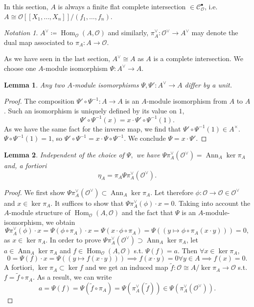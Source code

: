 \documentclass{article}
\theoremstyle{plain}%
\newtheorem{lemma}{Lemma}[section]
\theoremstyle{definition}
\theoremstyle{remark}
\newtheorem*{notation}{Notation}
\newcommand{\cob}{\mathcal{C}_\mathcal{O}^\bullet}
\newcommand{\ann}{\operatorname{Ann}}
\renewcommand{\hom}{\operatorname{Hom}}
\begin{document}
In this section, \(A\) is always a finite flat complete intersection \(\in \cob\), 
i.e. \(A \cong \mathcal{O}[[X_1, \dots, X_n]]/(f_1, \dots, f_n)\).
\begin{notation}
    \(A^\vee \coloneqq \hom_\mathcal{O}(A, \mathcal{O})\) and similarly, \(\pi_A^\vee \colon \mathcal{O}^\vee \to A^\vee\) 
    may denote the dual map associated to \(\pi_A\colon A \to \mathcal{O}\).
\end{notation}
As we have seen in the last section, \(A^\vee \cong A\) as \(A\) is a complete intersection.
We choose one \(A\)-module isomorphism \(\Psi\colon A^\vee \to A\).
\begin{lemma}
    Any two \(A\)-module isomorphisms \(\Psi, \Psi' \colon A^\vee \to A\) differ by a unit.
\end{lemma}
\begin{proof}
    The composition \(\Psi' \circ \Psi^{-1} \colon A \to A\) is an \(A\)-module isomorphism from \(A\) to \(A\).
    Such an isomorphism is uniquely defined by its value on \(1\),
    \[
        \Psi' \circ \Psi^{-1}(x) = x \cdot \Psi' \circ \Psi^{-1}(1).
    \]
    As we have the same fact for the inverse map, we find that \(\Psi' \circ \Psi^{-1}(1) \in A^\times\).
    \(\Psi \circ \Psi^{-1}(1) = 1\), so \(\Psi' \circ \Psi^{-1} = x \cdot \Psi \circ \Psi^{-1}\).
    We conclude \(\Psi = x \cdot \Psi'\).
\end{proof}

\begin{lemma}
    Independent of the choice of \(\Psi,\) we have 
    \(\Psi \pi_A^\vee(\mathcal{O}^\vee) = \ann_A \ker \pi_A\) and, a fortiori
    \[
        \eta_A = \pi_A \Psi \pi_A^\vee(\mathcal{O}^\vee).  
    \]
\end{lemma}
\begin{proof}
    We first show \(\Psi \pi_A^\vee(\mathcal{O}^\vee) \subset \ann_A \ker \pi_A\).
    Let therefore \(\phi\colon \mathcal{O} \to \mathcal{O} \in \mathcal{O}^\vee\) and \(x \in \ker \pi_A\).
    It suffices to show that \(\Psi \pi_A^\vee(\phi) \cdot x = 0\).
    Taking into account the \(A\)-module structure of \(\hom_\mathcal{O}(A, \mathcal{O})\) 
    and the fact that \(\Psi\) is an \(A\)-module-isomorphism, we obtain
    \[
        \Psi \pi_A^\vee(\phi) \cdot x = \Psi(\phi \circ \pi_A) \cdot x = \Psi(x \cdot \phi \circ \pi_A) 
        = \Psi((y \mapsto \phi \circ \pi_A(x\cdot y))) = 0,
    \]
    as \(x \in \ker \pi_A\).
    In order to prove  \(\Psi \pi_A^\vee(\mathcal{O}^\vee) \supset \ann_A \ker \pi_A\), let \(a \in \ann_A \ker \pi_A\)
    and \(f \in \hom_\mathcal{O}(A, \mathcal{O})\) s.t. \(\Psi(f) = a\). Then \(\forall x \in \ker \pi_A\),
    \[
        0 = \Psi(f) \cdot x = \Psi((y \mapsto f(x\cdot y))) \implies f(x\cdot y) = 0 \forall y \in A \implies f(x) = 0.
    \]
    A fortiori, \(\ker \pi_A \subset \ker f\) and we get an induced map \(\tilde f\colon \mathcal{O} \cong A/\ker \pi_A \to \mathcal{O}\)
    s.t. \(f = \tilde f \circ \pi_A\). As a result, we can write
    \[
        a = \Psi(f) = \Psi(\tilde f \circ \pi_A) = \Psi(\pi_A^\vee(\tilde f)) \in \Psi(\pi_A^\vee(\mathcal{O}^\vee)).  
    \]
\end{proof}
\end{document}
